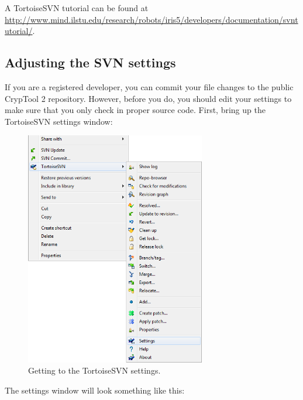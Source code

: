 A TortoiseSVN tutorial can be found at \url{http://www.mind.ilstu.edu/research/robots/iris5/developers/documentation/svntutorial/}.
\clearpage

\subsection{Adjusting the SVN settings}
\label{AdjustingTheSVNSettings}

If you are a registered developer, you can commit your file changes to the public CrypTool 2 repository. However, before you do, you should edit your settings to make sure that you only check in proper source code. First, bring up the TortoiseSVN settings window:

\begin{figure}[h!]
	\centering
		\includegraphics[width=0.70\textwidth]{figures/tortoise_svn_accessing_settings.png}
	\caption{Getting to the TortoiseSVN settings.}
	\label{fig:tortoise_svn_accessing_settings}
\end{figure}
\clearpage

\noindent The settings window will look something like this:

